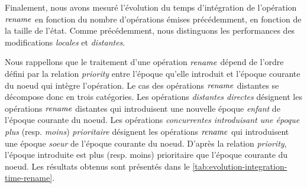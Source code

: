 \label{sec:integration-time-rename}

Finalement, nous avons mesuré l'évolution du temps d'intégration de l'opération $\mathit{rename}$ en fonction du nombre d'opérations émises précédemment, \ie en fonction de la taille de l'état.
Comme précédemment, nous distinguons les performances des modifications \emph{locales} et \emph{distantes}.

Nous rappellons que le traitement d'une opération $\mathit{rename}$ dépend de l'ordre défini par la relation \emph{priority} entre l'époque qu'elle introduit et l'époque courante du noeud qui intègre l'opération.
Le cas des opérations $\mathit{rename}$ distantes se décompose donc en trois catégories.
Les opérations \emph{distantes directes} désignent les opérations $\mathit{rename}$ distantes qui introduisent une nouvelle époque \emph{enfant} de l'époque courante du noeud.
Les opérations \emph{concurrentes introduisant une époque plus} (resp. \emph{moins}) \emph{ prioritaire} désignent les opérations $\mathit{rename}$ qui introduisent une époque \emph{soeur} de l'époque courante du noeud.
D'après la relation \emph{priority}, l'époque introduite est plus (resp. moins) prioritaire que l'époque courante du noeud.
Les résultats obtenus sont présentés dans le \autoref{tab:evolution-integration-time-rename}.

